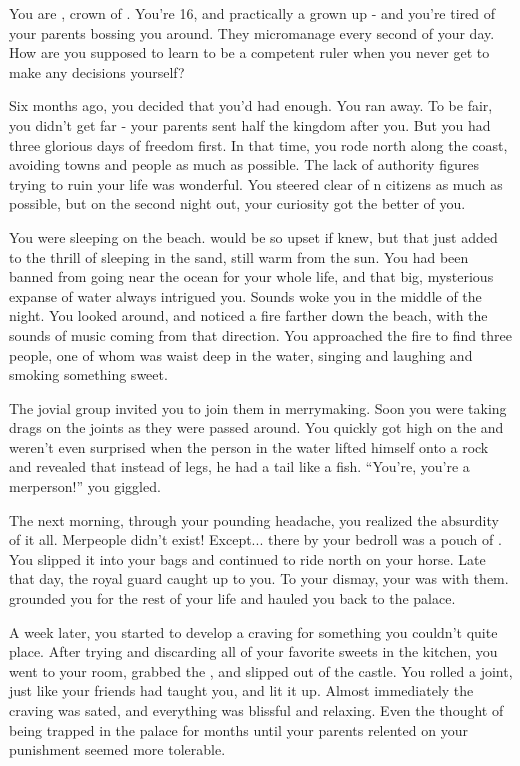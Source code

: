 \documentclass[char]{NeptuneBall}
\begin{document}
\name{\cWillow{}}
%

You are \cWillow{}, crown \cWillow{\prince} of \pAmerica{}. You're 16, and practically a grown up - and you're tired of your parents bossing you around. They micromanage every second of your day. How are you supposed to learn to be a competent ruler when you never get to make any decisions yourself?

Six months ago, you decided that you'd had enough. You ran away. To be fair, you didn't get far - your parents sent half the kingdom after you. But you had three glorious days of freedom first. In that time, you rode north along the coast, avoiding towns and people as much as possible. The lack of authority figures trying to ruin your life was wonderful. You steered clear of \pAmerica{}n citizens as much as possible, but on the second night out, your curiosity got the better of you.

You were sleeping on the beach. \cAriel{\Parent} would be so upset if \cAriel{\they} knew, but that just added to the thrill of sleeping in the sand, still warm from the sun. You had been banned from going near the ocean for your whole life, and that big, mysterious expanse of water always intrigued you. Sounds woke you in the middle of the night. You looked around, and noticed a fire farther down the beach, with the sounds of music coming from that direction. You approached the fire to find three people, one of whom was waist deep in the water, singing and laughing and smoking something sweet.

The jovial group invited you to join them in merrymaking. Soon you were taking drags on the joints as they were passed around. You quickly got high on the \iDrug{\MYname} and weren't even surprised when the person in the water lifted himself onto a rock and revealed that instead of legs, he had a tail like a fish. ``You're, you're a merperson!'' you giggled.

The next morning, through your pounding headache, you realized the absurdity of it all. Merpeople didn't exist! Except... there by your bedroll was a pouch of \iDrug{\MYname}. You slipped it into your bags and continued to ride north on your horse. Late that day, the royal guard caught up to you. To your dismay, your \cAriel{\parent} was with them. \cAriel{} grounded you for the rest of your life and hauled you back to the palace.

A week later, you started to develop a craving for something you couldn't quite place. After trying and discarding all of your favorite sweets in the kitchen, you went to your room, grabbed the \iDrug{\MYname}, and slipped out of the castle.  You rolled a joint, just like your friends had taught you, and lit it up. Almost immediately the craving was sated, and everything was blissful and relaxing. Even the thought of being trapped in the palace for months until your parents relented on your punishment seemed more tolerable.
\end{document}
